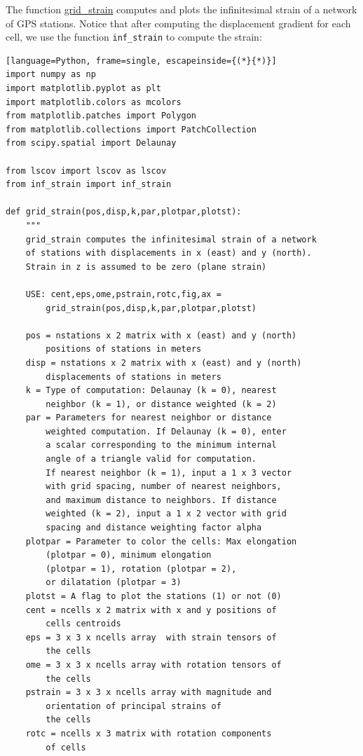 \documentclass[a4paper , 12pt]{book}
\newcommand{\code}[1]{\colorbox{light-gray}{\texttt{#1}}}
\begin{document}
The function \href{https://github.com/nfcd/compGeo/blob/master/source/functions/grid_strain.py}{grid\_strain} computes and plots the infinitesimal strain of a network of GPS stations. Notice that after computing the displacement gradient for each cell, we use the function {\code{inf\_strain}} to compute the strain:

\begin{center}
\begin{lstlisting}[language=Python, frame=single, escapeinside={(*}{*)}]
import numpy as np
import matplotlib.pyplot as plt
import matplotlib.colors as mcolors
from matplotlib.patches import Polygon
from matplotlib.collections import PatchCollection
from scipy.spatial import Delaunay

from lscov import lscov as lscov
from inf_strain import inf_strain

def grid_strain(pos,disp,k,par,plotpar,plotst):
	"""
	grid_strain computes the infinitesimal strain of a network
	of stations with displacements in x (east) and y (north).
	Strain in z is assumed to be zero (plane strain)
	
	USE: cent,eps,ome,pstrain,rotc,fig,ax = 
		grid_strain(pos,disp,k,par,plotpar,plotst)
	
	pos = nstations x 2 matrix with x (east) and y (north)
		positions of stations in meters
	disp = nstations x 2 matrix with x (east) and y (north)
		displacements of stations in meters
	k = Type of computation: Delaunay (k = 0), nearest
		neighbor (k = 1), or distance weighted (k = 2)
	par = Parameters for nearest neighbor or distance
		weighted computation. If Delaunay (k = 0), enter
		a scalar corresponding to the minimum internal
		angle of a triangle valid for computation.
		If nearest neighbor (k = 1), input a 1 x 3 vector
		with grid spacing, number of nearest neighbors,
		and maximum distance to neighbors. If distance
		weighted (k = 2), input a 1 x 2 vector with grid
		spacing and distance weighting factor alpha
	plotpar = Parameter to color the cells: Max elongation
		(plotpar = 0), minimum elongation
		(plotpar = 1), rotation (plotpar = 2),
		or dilatation (plotpar = 3)
	plotst = A flag to plot the stations (1) or not (0)
	cent = ncells x 2 matrix with x and y positions of 
		cells centroids
	eps = 3 x 3 x ncells array	with strain tensors of
		the cells
	ome = 3 x 3 x ncells array with rotation tensors of
		the cells
	pstrain = 3 x 3 x ncells array with magnitude and
		orientation of principal strains of
		the cells
	rotc = ncells x 3 matrix with rotation components
		of cells
		

\end{lstlisting}
\end{center}
\end{document}
